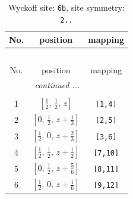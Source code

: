 \documentclass[fleqn,8pt]{jsarticle}
\begin{document}
\begin{longtable}{ccc}
\caption{Wyckoff site: {\tt 6b}, site symmetry: {\tt 2..}}
 \\
 \hline \hline
No. & position & mapping \\ \hline \endfirsthead

\multicolumn{2}{l}{\tablename\ \thetable{}} \\
 \hline \hline
No. & position & mapping \\ \hline \endhead

 \hline \hline
\multicolumn{2}{r}{\footnotesize\it continued ...} \\ \endfoot

 \hline \hline
\multicolumn{2}{r}{} \\ \endlastfoot

1 & $\left[ \frac{1}{2},\, \frac{1}{2},\, z \right]$ & {\tt [1,4]} \\ \hline
2 & $\left[ 0,\, \frac{1}{2},\, z + \frac{1}{3} \right]$ & {\tt [2,5]} \\ \hline
3 & $\left[ \frac{1}{2},\, 0,\, z + \frac{2}{3} \right]$ & {\tt [3,6]} \\ \hline
4 & $\left[ \frac{1}{2},\, \frac{1}{2},\, z + \frac{1}{2} \right]$ & {\tt [7,10]} \\ \hline
5 & $\left[ 0,\, \frac{1}{2},\, z + \frac{5}{6} \right]$ & {\tt [8,11]} \\ \hline
6 & $\left[ \frac{1}{2},\, 0,\, z + \frac{1}{6} \right]$ & {\tt [9,12]} \\
\end{longtable}
\renewcommand{\arraystretch}{1.2}
\end{document}
